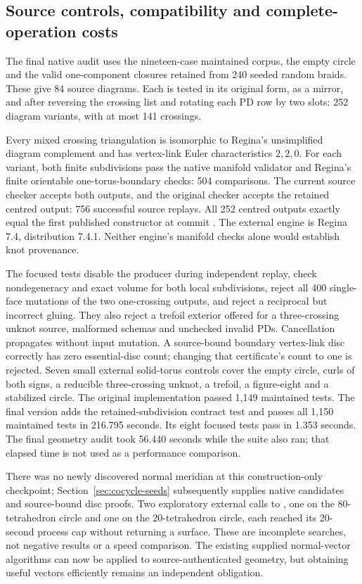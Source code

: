\subsection{Source controls, compatibility and complete-operation costs}

The final native audit uses the nineteen-case maintained corpus, the empty
circle and the valid one-component closures retained from 240 seeded random
braids. These give 84 source diagrams. Each is tested in its original form,
as a mirror, and after reversing the crossing list and rotating each PD row
by two slots: 252 diagram variants, with at most 141 crossings.

Every mixed crossing triangulation is isomorphic to Regina's unsimplified
diagram complement and has vertex-link Euler characteristics $2,2,0$.
For each variant, both finite subdivisions pass the native manifold validator
and Regina's finite orientable one-torus-boundary checks: 504 comparisons.
The current source checker accepts both outputs, and the original checker
accepts the retained centred output: 756 successful source replays. All 252
centred outputs exactly equal the first published constructor at commit
. The external engine is Regina 7.4, distribution 7.4.1.
Neither engine's manifold checks alone would establish knot provenance.

The focused tests disable the producer during independent replay, check
nondegeneracy and exact volume for both local subdivisions, reject all 400
single-face mutations of the two one-crossing outputs, and reject a
reciprocal but incorrect gluing. They also reject a trefoil exterior offered
for a three-crossing unknot source, malformed schemas and unchecked invalid
PDs. Cancellation propagates without input mutation. A source-bound boundary
vertex-link disc correctly has zero essential-disc count; changing that
certificate's count to one is rejected. Seven small external solid-torus
controls cover the empty circle, curls of both signs, a reducible
three-crossing unknot, a trefoil, a figure-eight and a stabilized circle.
The original implementation passed 1,149 maintained tests. The final version
adds the retained-subdivision contract test and passes all 1,150 maintained
tests in 216.795 seconds. Its eight focused tests pass in 1.353 seconds.
The final geometry audit took 56.440 seconds while the suite also ran;
that elapsed time is not used as a performance comparison.

There was no newly discovered normal meridian at this construction-only
checkpoint; Section~\ref{sec:cocycle-seeds} subsequently supplies native
candidates and source-bound disc proofs. Two
exploratory external calls to , one on the
80-tetrahedron circle and one on the 20-tetrahedron circle, each reached its
20-second process cap without returning a surface. These are incomplete
searches, not negative results or a speed comparison. The existing supplied
normal-vector algorithms can now be applied to source-authenticated geometry,
but obtaining useful vectors efficiently remains an independent obligation.

